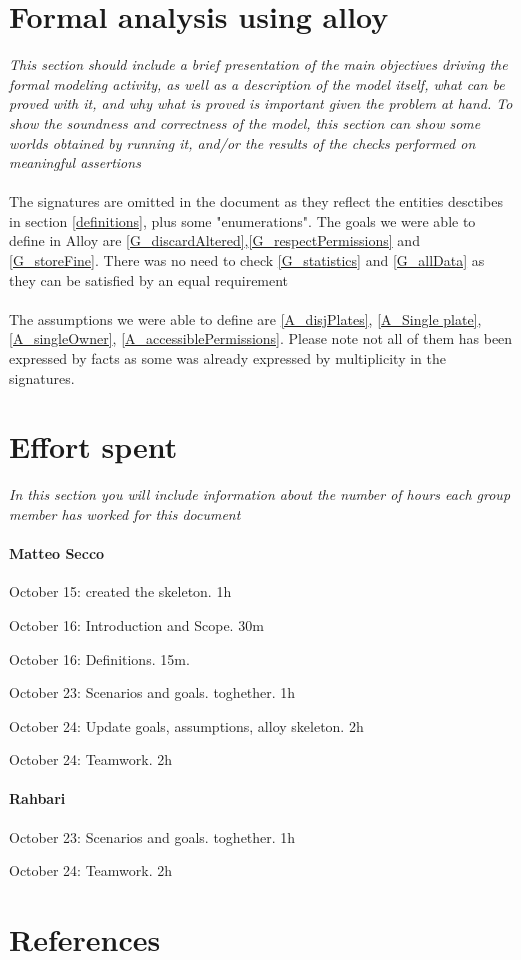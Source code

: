 \documentclass{article}
\begin{document}
\section{Formal analysis using alloy} \textit{This section should include a brief presentation of the main objectives driving the formal modeling activity, as well as a description of the model itself, what can be proved with it, and why what is proved is important given the problem at hand. To show the soundness and correctness of the model, this section can show some worlds obtained by running it, and/or the results of the checks performed on meaningful assertions}
	\paragraph{}The signatures are omitted in the document as they reflect the entities 				desctibes in section \ref{definitions}, plus some "enumerations". The goals we were able to define in Alloy are \ref{G_discardAltered},\ref{G_respectPermissions} and \ref{G_storeFine}.
	There was no need to check \ref{G_statistics} and \ref{G_allData} as they can be satisfied 	by an equal requirement
	\paragraph{}The assumptions we were able to define are \ref{A_disjPlates}, \ref{A_Single plate}, \ref{A_singleOwner}, \ref{A_accessiblePermissions}. Please note not all of them has been expressed by facts as some was already expressed by multiplicity in the signatures.
\section{Effort spent} \textit{In this section you will include information about the number of hours each group member has worked for this document}
	\paragraph{Matteo Secco} 
		\begin{list}{-}{}
			\item October 15: created the skeleton. 1h
			\item October 16: Introduction and Scope. 30m
			\item October 16: Definitions. 15m.
			\item October 23: Scenarios and goals. toghether. 1h
			\item October 24: Update goals, assumptions, alloy skeleton. 2h
			\item October 24: Teamwork. 2h
		\end{list}
	\paragraph{Rahbari}
		\begin{list}{-}{}
			\item October 23: Scenarios and goals. toghether. 1h
			\item October 24: Teamwork. 2h
		\end{list}
\section{References}
\end{document}
